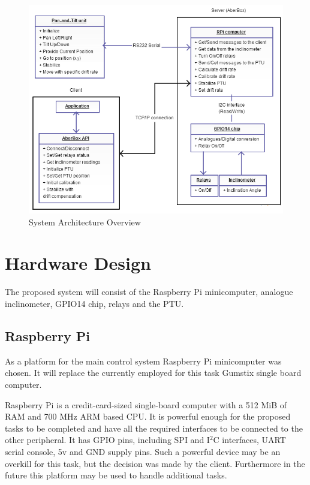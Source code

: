 \begin{figure}[H]
\centering
\centerline{\includegraphics[scale=0.80]{./images/SystemArchitectureOverview}}
\caption{System Architecture Overview}
\label{fig:SystemArchitectureOverview}
\end{figure}

\section{Hardware Design}
The proposed system will consist of the Raspberry Pi minicomputer, analogue inclinometer, GPIO14 chip, relays and the PTU.

\subsection{Raspberry Pi}
As a platform for the main control system Raspberry Pi minicomputer was chosen. It will replace the currently employed for this task Gumstix single board computer. 

Raspberry Pi is a credit-card-sized single-board computer with a 512 MiB of RAM and 700 MHz ARM based CPU. It is powerful enough for the proposed tasks to be completed and have all the required interfaces to be connected to the other peripheral. It has GPIO pins, including SPI and I$^2$C interfaces, UART serial console, 5v and GND supply pins. Such a powerful device may be an overkill for this task, but the decision was made by the client. Furthermore in the future this platform may be used to handle additional tasks.


